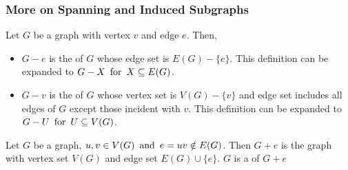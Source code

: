 \subsubsection*{More on Spanning and Induced Subgraphs}
Let $G$ be a graph with vertex $v$ and edge $e$. Then,
\begin{itemize}
    \item $G-e$ is the  of $G$ whose edge set is $E(G)-\{e\}$. 
        \subitem This definition can be expanded to $G-X \operatorname{~\text{for}~} X \subseteq E(G)$.
    \item $G-v$ is the  of $G$ whose vertex set is $V(G) - \{v\}$ and edge set includes all edges of $G$ except those incident with $v$. 
        \subitem This definition can be expanded to $G-U \operatorname{~\text{for}~} U \subseteq V(G)$.
\end{itemize}
Let $G$ be a graph, $u,v \in V(G) \operatorname{~\text{and}~} e = uv \notin E(G)$. Then $G+e$ is the graph with vertex set $V(G)$ and edge set $E(G) \cup \{e\}$. $G$ is a  of $G+e$